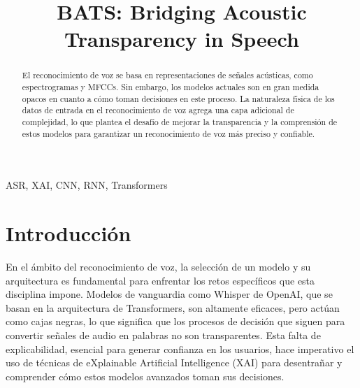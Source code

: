 \documentclass[conference]{IEEEtran}
\begin{document}
\title{BATS: Bridging Acoustic Transparency in Speech}

\author{
\and
{}
}

\maketitle

\begin{abstract}

El reconocimiento de voz se basa en representaciones de señales acústicas, como espectrogramas y MFCCs. Sin embargo, los modelos actuales son en gran medida opacos en cuanto a cómo toman decisiones en este proceso. La naturaleza física de los datos de entrada en el reconocimiento de voz agrega una capa adicional de complejidad, lo que plantea el desafío de mejorar la transparencia y la comprensión de estos modelos para garantizar un reconocimiento de voz más preciso y confiable.

\end{abstract}

\begin{IEEEkeywords}
ASR, XAI, CNN, RNN, Transformers
\end{IEEEkeywords}

\section{Introducción}

En el ámbito del reconocimiento de voz, la selección de un modelo y su arquitectura es fundamental para enfrentar los retos específicos que esta disciplina impone. Modelos de vanguardia como Whisper de OpenAI, que se basan en la arquitectura de Transformers, son altamente eficaces, pero actúan como cajas negras, lo que significa que los procesos de decisión que siguen para convertir señales de audio en palabras no son transparentes. Esta falta de explicabilidad, esencial para generar confianza en los usuarios, hace imperativo el uso de técnicas de eXplainable Artificial Intelligence (XAI) para desentrañar y comprender cómo estos modelos avanzados toman sus decisiones.
\end{document}

